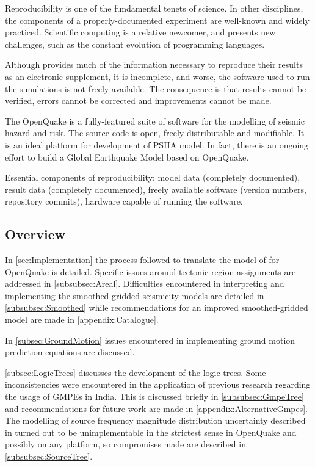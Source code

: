 \documentclass{article}
\begin{document}
Reproducibility is one of the fundamental tenets of science. In other disciplines, the components of a properly-documented experiment are well-known and widely practiced. Scientific computing is a relative newcomer, and presents new challenges, such as the constant evolution of programming languages.

Although \cite{nath2012probabilistic} provides much of the information necessary to reproduce their results as an electronic supplement, it is incomplete, and worse, the software used to run the simulations is not freely available. The consequence is that results cannot be verified, errors cannot be corrected and improvements cannot be made.

The OpenQuake \citep{crowley2015openquake} is a fully-featured suite of software for the modelling of seismic hazard and risk. The source code is open, freely distributable and modifiable. It is an ideal platform for development of PSHA model. In fact, there is an ongoing effort to build a Global Earthquake Model based on OpenQuake.

Essential components of reproducibility: model data (completely documented), result data (completely documented), freely available software (version numbers, repository commits), hardware capable of running the software.



\subsection{Overview}
\label{subsec:Overview}

In \autoref{sec:Implementation} the process followed to translate the model of \cite{nath2012probabilistic} for OpenQuake is detailed. Specific issues around tectonic region assignments are addressed in \autoref{subsubsec:Areal}. Difficulties encountered in interpreting and implementing the smoothed-gridded seismicity models are detailed in \autoref{subsubsec:Smoothed} while recommendations for an improved smoothed-gridded model are made in \autoref{appendix:Catalogue}.

In \autoref{subsec:GroundMotion} issues encountered in implementing ground motion prediction equations are discussed.

\autoref{subsec:LogicTrees} discusses the development of the logic trees. Some inconsistencies were encountered in the application of previous research regarding the usage of GMPEs in India. This is discussed briefly in \autoref{subsubsec:GmpeTree} and recommendations for future work are made in \autoref{appendix:AlternativeGmpes}. The modelling of source frequency magnitude distribution uncertainty described in \cite{nath2012probabilistic} turned out to be unimplementable in the strictest sense in OpenQuake and possibly on any platform, so compromises made are described in \autoref{subsubsec:SourceTree}.
\end{document}
